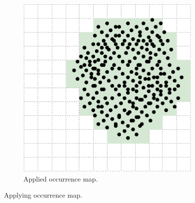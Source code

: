 \begin{figure}[ht]
    \begin{subfigure}[t]{0.5\textwidth}
        \includegraphics[width=\textwidth]{figs/implementation/occurrence-map-applied.pdf}
        \caption{Applied occurrence map.}
    \end{subfigure}
    
    \caption{Applying occurrence map.}
    \label{fig:occurrence_map}
\end{figure}
